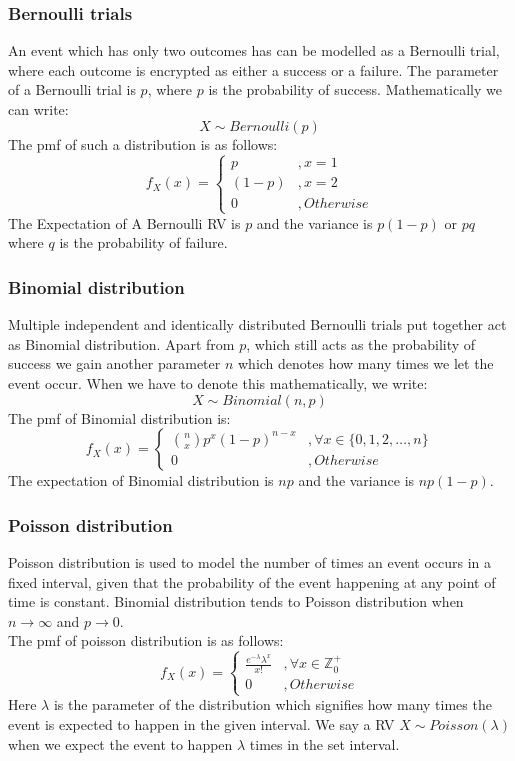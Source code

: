 \documentclass[11pt,letterpaper]{article}
\begin{document}
\subsubsection{Bernoulli trials}
An event which has only two outcomes has can be modelled as a Bernoulli trial, where 
each outcome is encrypted as either a success or a failure. The parameter of a Bernoulli
trial is $p$, where $p$ is the probability of success. Mathematically we can write:
\[
  X \sim Bernoulli(p)
\]
The pmf of such a distribution is as follows: 
\[
  f_X(x) = \begin{cases} p &, x = 1\\ 
  (1-p) &, x = 2\\ 
  0 &, Otherwise\end{cases}
\]
The Expectation of A Bernoulli RV is $p$ and the variance is $p(1-p)$ or $pq$
where $q$ is the probability of failure.

\subsubsection{Binomial distribution}
Multiple independent and identically distributed Bernoulli trials put together act as 
Binomial distribution. Apart from $p$, which still acts as the probability of success
we gain another parameter $n$ which denotes how many times we let the event occur. 
When we have to denote this mathematically, we write: 
\[
  X \sim Binomial(n,p)
\]
The pmf of Binomial distribution is:
\[
  f_X(x) = \begin{cases} {n \choose x} p^x (1-p)^{n-x} &,\forall x \in \{0, 1, 2, \dots, n\}\\
  0 &, Otherwise\end{cases}
\]
The expectation of Binomial distribution is $np$ and the variance is $np(1-p)$.
\subsubsection{Poisson distribution}
Poisson distribution is used to model the number of times an event occurs in a fixed
interval, given that the probability of the event happening at any point of time is 
constant. Binomial distribution tends to Poisson distribution when $n \to \infty$ and 
$p \to 0$. \\ 
The pmf of poisson distribution is as follows: 
\[
  f_X(x) = \begin{cases} \frac{e^{-\lambda}\lambda^x}{x!} &, \forall x \in \mathbb{Z}^+_0\\ 
  0 &, Otherwise\end{cases}
\]
Here $\lambda$ is the parameter of the distribution which signifies how many times the event 
is expected to happen in the given interval. We say a RV $X \sim Poisson(\lambda)$ when
we expect the event to happen $\lambda$ times in the set interval.
\end{document}
